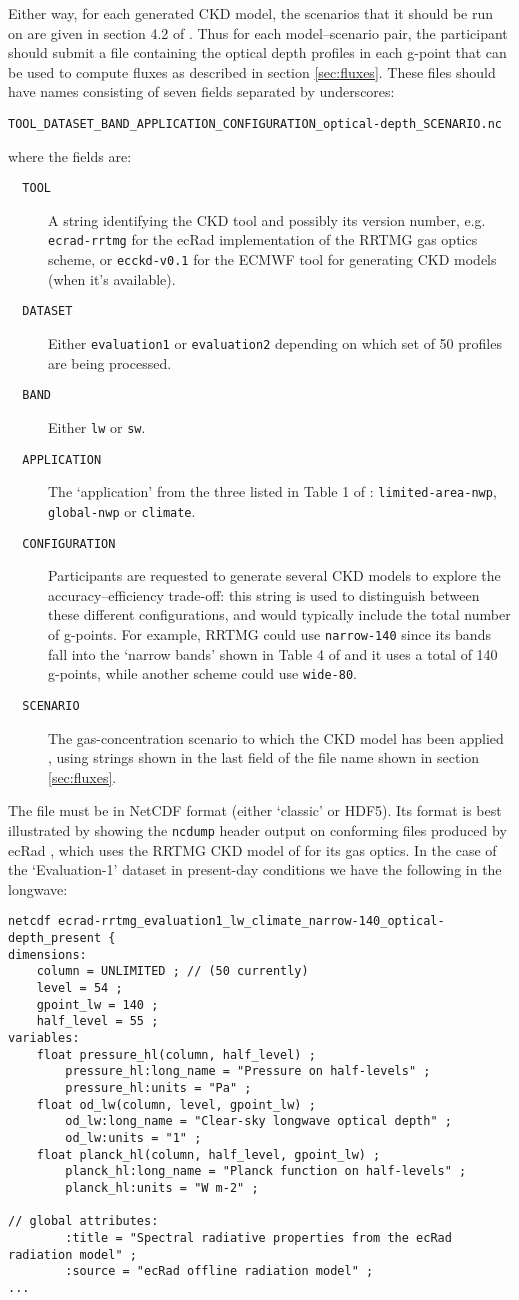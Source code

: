 \documentclass[twoside]{article}
\def\codesize{\small}
\def\code#1{{\codesize\texttt{#1}}}
\def\citem#1{\item[{\codesize\texttt{#1}}]}
\begin{document}
Either way, for each generated CKD model, the scenarios that it should
be run on are given in section 4.2 of \cite{Hogan+2020}.  Thus for
each model--scenario pair, the participant should submit a file
containing the optical depth profiles in each g-point that can be used
to compute fluxes as described in section \ref{sec:fluxes}.
%
These files should have names consisting of seven fields separated
by underscores:
%
\begin{verbatim}
TOOL_DATASET_BAND_APPLICATION_CONFIGURATION_optical-depth_SCENARIO.nc
\end{verbatim}
%
where the fields are:
\begin{description}
\citem{~~TOOL} A string identifying the CKD tool and possibly its
version number, e.g. \code{ecrad-rrtmg} for the ecRad implementation
of the RRTMG gas optics scheme, or \code{ecckd-v0.1} for the ECMWF
tool for generating CKD models (when it's available).
\citem{~~DATASET} Either \code{evaluation1} or \code{evaluation2}
depending on which set of 50 profiles are being processed.
\citem{~~BAND} Either \code{lw} or \code{sw}.
\citem{~~APPLICATION} The `application' from the three listed in Table
1 of \cite{Hogan+2020}: \code{limited-area-nwp}, \code{global-nwp} or
\code{climate}.
\citem{~~CONFIGURATION} Participants are requested to generate several
CKD models to explore the accuracy--efficiency trade-off: this string
is used to distinguish between these different configurations, and
would typically include the total number of g-points.  For example,
RRTMG could use \code{narrow-140} since its bands fall into the
`narrow bands' shown in Table 4 of \cite{Hogan+2020} and it uses a
total of 140 g-points, while another scheme could use \code{wide-80}.
\citem{~~SCENARIO} The gas-concentration scenario to which the CKD
model has been applied \cite[see Table 2 and section 4.2
  of][]{Hogan+2020}, using strings shown in the last field of the file
name shown in section \ref{sec:fluxes}.
\end{description}
%
The file must be in NetCDF format (either `classic' or HDF5).  Its
format is best illustrated by showing the \code{ncdump} header output
on conforming files produced by ecRad \cite[]{Hogan&2018}, which uses
the RRTMG CKD model of \cite{Mlawer+1997} for its gas optics. In the
case of the `Evaluation-1' dataset in present-day conditions we have
the following in the longwave:
%
\begin{verbatim}
netcdf ecrad-rrtmg_evaluation1_lw_climate_narrow-140_optical-depth_present {
dimensions:
    column = UNLIMITED ; // (50 currently)
    level = 54 ;
    gpoint_lw = 140 ;
    half_level = 55 ;
variables:
    float pressure_hl(column, half_level) ;
        pressure_hl:long_name = "Pressure on half-levels" ;
        pressure_hl:units = "Pa" ;
    float od_lw(column, level, gpoint_lw) ;
        od_lw:long_name = "Clear-sky longwave optical depth" ;
        od_lw:units = "1" ;
    float planck_hl(column, half_level, gpoint_lw) ;
        planck_hl:long_name = "Planck function on half-levels" ;
        planck_hl:units = "W m-2" ;

// global attributes:
        :title = "Spectral radiative properties from the ecRad radiation model" ;
        :source = "ecRad offline radiation model" ;
...
\end{verbatim}
\end{document}
